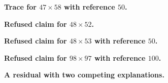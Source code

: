 \documentclass[11pt]{article}
\theoremstyle{definition}
\theoremstyle{remark}
\begin{document}
\medskip
\noindent\begin{minipage}{\linewidth}
\noindent\textbf{Trace for $47\times 58$ with reference $50$.}
\begin{small}
\end{small}
\end{minipage}

\medskip
\noindent\begin{minipage}{\linewidth}
\noindent\textbf{Refused claim for $48\times 52$.}
\begin{small}
\end{small}
\end{minipage}

\medskip
\noindent\begin{minipage}{\linewidth}
\noindent\textbf{Refused claim for $48\times 53$ with reference $50$.}
\begin{small}
\end{small}
\end{minipage}

\medskip
\noindent\begin{minipage}{\linewidth}
\noindent\textbf{Refused claim for $98\times 97$ with reference $100$.}
\begin{small}
\end{small}
\end{minipage}

\medskip
\noindent\begin{minipage}{\linewidth}
\noindent\textbf{A residual with two competing explanations.}
\begin{small}
\end{small}
\end{minipage}
\end{document}
